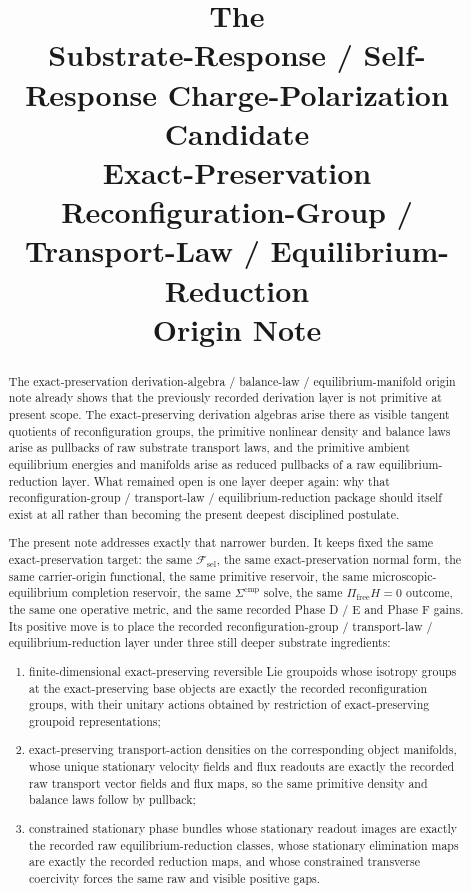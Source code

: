 \documentclass[11pt]{article}
\title{\textbf{The \TheoryName{}}\\[0.4em]
\large Substrate-Response / Self-Response Charge-Polarization Candidate\\
\large Exact-Preservation Reconfiguration-Group / Transport-Law / Equilibrium-Reduction\\
\large Origin Note}
\author{}
\date{}
\newcommand{\StemFunctional}{\mathscr F_{\mathrm{sel}}}
\begin{document}
\maketitle

\begin{abstract}
The exact-preservation derivation-algebra / balance-law / equilibrium-manifold origin note already shows that the previously recorded derivation layer is not primitive at present scope. The exact-preserving derivation algebras arise there as visible tangent quotients of reconfiguration groups, the primitive nonlinear density and balance laws arise as pullbacks of raw substrate transport laws, and the primitive ambient equilibrium energies and manifolds arise as reduced pullbacks of a raw equilibrium-reduction layer. What remained open is one layer deeper again: why that reconfiguration-group / transport-law / equilibrium-reduction package should itself exist at all rather than becoming the present deepest disciplined postulate.

The present note addresses exactly that narrower burden. It keeps fixed the same exact-preservation target: the same \(\StemFunctional\), the same exact-preservation normal form, the same carrier-origin functional, the same primitive reservoir, the same microscopic-equilibrium completion reservoir, the same \(\Sigma^{\mathrm{cmp}}\) solve, the same \(\Pi_{\mathrm{free}}H=0\) outcome, the same one operative metric, and the same recorded Phase D / E and Phase F gains. Its positive move is to place the recorded reconfiguration-group / transport-law / equilibrium-reduction layer under three still deeper substrate ingredients:
\begin{enumerate}
    \item finite-dimensional exact-preserving reversible Lie groupoids whose isotropy groups at the exact-preserving base objects are exactly the recorded reconfiguration groups, with their unitary actions obtained by restriction of exact-preserving groupoid representations;
    \item exact-preserving transport-action densities on the corresponding object manifolds, whose unique stationary velocity fields and flux readouts are exactly the recorded raw transport vector fields and flux maps, so the same primitive density and balance laws follow by pullback;
    \item constrained stationary phase bundles whose stationary readout images are exactly the recorded raw equilibrium-reduction classes, whose stationary elimination maps are exactly the recorded reduction maps, and whose constrained transverse coercivity forces the same raw and visible positive gaps.
\end{enumerate}


\end{abstract}
\end{document}

